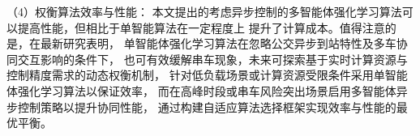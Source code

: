 （4）权衡算法效率与性能：
本文提出的考虑异步控制的多智能体强化学习算法可以提高性能，但相比于单智能算法在一定程度上
提升了计算成本。值得注意的是，在最新研究表明\cite{xu2025reinforcement}，
单智能体强化学习算法在忽略公交异步到站特性及多车协同交互影响的条件下，
也可有效缓解串车现象，未来可探索基于实时计算资源与控制精度需求的动态权衡机制，
针对低负载场景或计算资源受限条件采用单智能体强化学习算法以保证效率，
而在高峰时段或串车风险突出场景启用多智能体异步控制策略以提升协同性能，
通过构建自适应算法选择框架实现效率与性能的最优平衡。



